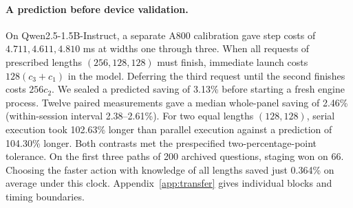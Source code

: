 \paragraph{A prediction before device validation.}
On Qwen2.5-1.5B-Instruct, a separate A800 calibration gave step costs of $4.711,4.611,4.810$ ms at widths one through three. When all requests of prescribed lengths $(256,128,128)$ must finish, immediate launch costs $128(c_3+c_1)$ in the model. Deferring the third request until the second finishes costs $256c_2$. We sealed a predicted saving of 3.13\% before starting a fresh engine process. Twelve paired measurements gave a median whole-panel saving of 2.46\% (within-session interval 2.38--2.61\%). For two equal lengths $(128,128)$, serial execution took 102.63\% longer than parallel execution against a prediction of 104.30\% longer. Both contrasts met the prespecified two-percentage-point tolerance. On the first three paths of 200 archived questions, staging won on 66. Choosing the faster action with knowledge of all lengths saved just 0.364\% on average under this clock. Appendix~\ref{app:transfer} gives individual blocks and timing boundaries.
